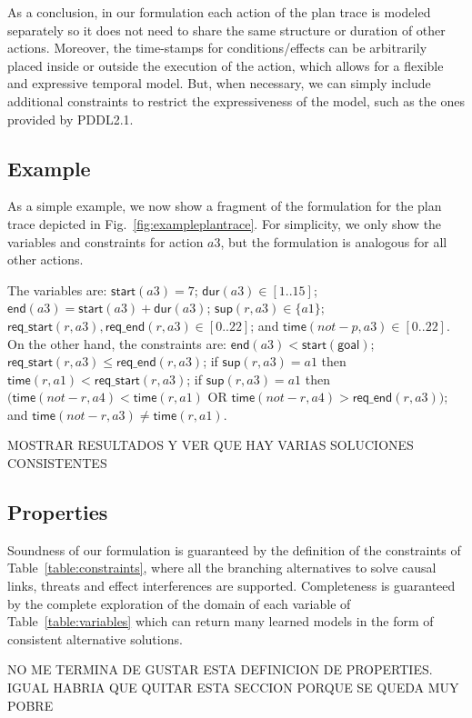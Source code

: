 \documentclass[runningheads]{llncs}
\newcommand{\dur}{\mathsf{dur}}    %
\newcommand{\start}{\mathsf{start}}%
\newcommand{\en}{\mathsf{end}}     %
\newcommand{\supp}{\mathsf{sup}}   %
\newcommand{\tim}{\mathsf{time}}   %
\newcommand{\reqs}{\mathsf{req\_{start}}} %
\newcommand{\reqe}{\mathsf{req\_{end}}}   %
\newcommand{\goal}{\mathsf{goal}}  %
\begin{document}
As a conclusion, in our formulation each action of the plan trace is modeled separately so it does not need to share the same structure or duration of other actions. Moreover, the time-stamps for conditions/effects can be arbitrarily placed inside or outside the execution of the action, which allows for a flexible and expressive temporal model. But, when necessary, we can simply include additional constraints to restrict the expressiveness of the model, such as the ones provided by PDDL2.1.


\subsection{Example}
\label{section:example}

As a simple example, we now show a fragment of the formulation for the plan trace depicted in Fig.~\ref{fig:exampleplantrace}. For simplicity, we only show the variables and constraints for action $a3$, but the formulation is analogous for all other actions. 

The variables are: $\start(a3)=7$; $\dur(a3) \in [1..15]$; $\en(a3)=\start(a3)+\dur(a3)$; $\supp(r,a3) \in \{a1\}$; $\reqs(r,a3),\reqe(r,a3) \in [0..22]$; and $\tim(not-p,a3) \in [0..22]$.
On the other hand, the constraints are: $\en(a3) < \start(\goal)$; $\reqs(r,a3) \leq \reqe(r,a3)$; if $\supp(r,a3)=a1$ then $\tim(r,a1) < \reqs(r,a3)$; if $\supp(r,a3)=a1$ then $(\tim(not-r,a4) < \tim(r,a1)$ OR $\tim(not-r,a4) > \reqe(r,a3))$; and $\tim(not-r,a3) \neq \tim(r,a1)$.


MOSTRAR RESULTADOS Y VER QUE HAY VARIAS SOLUCIONES CONSISTENTES



\subsection{Properties}

Soundness of our formulation is guaranteed by the definition of the constraints of Table~\ref{table:constraints}, where all the branching alternatives to solve causal links, threats and effect interferences are supported. Completeness is guaranteed by the complete exploration of the domain of each variable of Table~\ref{table:variables} which can return many learned models in the form of consistent alternative solutions.


NO ME TERMINA DE GUSTAR ESTA DEFINICION DE PROPERTIES. IGUAL HABRIA QUE QUITAR ESTA SECCION PORQUE SE QUEDA MUY POBRE
\end{document}
